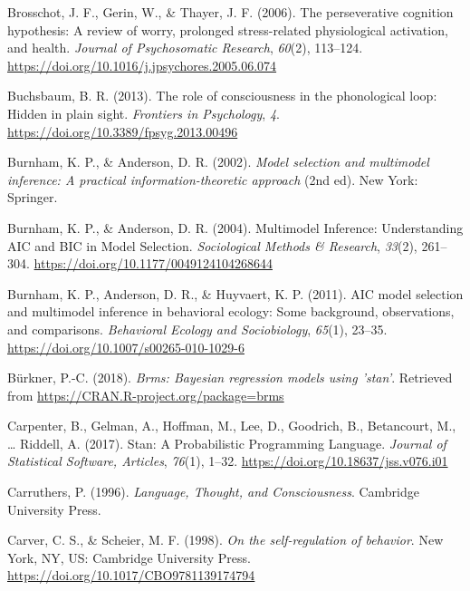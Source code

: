\documentclass[a4paper,12pt,twoside,openright,oldfontcommands]{memoir}
\begin{document}
\leavevmode\hypertarget{ref-Brosschot2006}{}%
Brosschot, J. F., Gerin, W., \& Thayer, J. F. (2006). The perseverative cognition hypothesis: A review of worry, prolonged stress-related physiological activation, and health. \emph{Journal of Psychosomatic Research}, \emph{60}(2), 113--124. \url{https://doi.org/10.1016/j.jpsychores.2005.06.074}

\leavevmode\hypertarget{ref-buchsbaum_role_2013}{}%
Buchsbaum, B. R. (2013). The role of consciousness in the phonological loop: Hidden in plain sight. \emph{Frontiers in Psychology}, \emph{4}. \url{https://doi.org/10.3389/fpsyg.2013.00496}

\leavevmode\hypertarget{ref-burnham_model_2002}{}%
Burnham, K. P., \& Anderson, D. R. (2002). \emph{Model selection and multimodel inference: A practical information-theoretic approach} (2nd ed). New York: Springer.

\leavevmode\hypertarget{ref-burnham_multimodel_2004}{}%
Burnham, K. P., \& Anderson, D. R. (2004). Multimodel Inference: Understanding AIC and BIC in Model Selection. \emph{Sociological Methods \& Research}, \emph{33}(2), 261--304. \url{https://doi.org/10.1177/0049124104268644}

\leavevmode\hypertarget{ref-burnham_aic_2011}{}%
Burnham, K. P., Anderson, D. R., \& Huyvaert, K. P. (2011). AIC model selection and multimodel inference in behavioral ecology: Some background, observations, and comparisons. \emph{Behavioral Ecology and Sociobiology}, \emph{65}(1), 23--35. \url{https://doi.org/10.1007/s00265-010-1029-6}

\leavevmode\hypertarget{ref-R-brms}{}%
Bürkner, P.-C. (2018). \emph{Brms: Bayesian regression models using 'stan'}. Retrieved from \url{https://CRAN.R-project.org/package=brms}

\leavevmode\hypertarget{ref-carpenter_stan:_2017}{}%
Carpenter, B., Gelman, A., Hoffman, M., Lee, D., Goodrich, B., Betancourt, M., \ldots{} Riddell, A. (2017). Stan: A Probabilistic Programming Language. \emph{Journal of Statistical Software, Articles}, \emph{76}(1), 1--32. \url{https://doi.org/10.18637/jss.v076.i01}

\leavevmode\hypertarget{ref-carruthers_language_1996}{}%
Carruthers, P. (1996). \emph{Language, Thought, and Consciousness}. Cambridge University Press.

\leavevmode\hypertarget{ref-carver_self-regulation_1998}{}%
Carver, C. S., \& Scheier, M. F. (1998). \emph{On the self-regulation of behavior}. New York, NY, US: Cambridge University Press. \url{https://doi.org/10.1017/CBO9781139174794}
\end{document}
